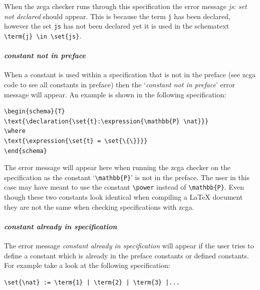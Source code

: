 When the \gls{zcga} checker runs through this specification the error message
\emph{js: set not declared} should appear. This is because the term \verb|j| has
been declared, however the set \verb|js| has not been declared yet it is used in
the schematext \verb|\term{j} \in \set{js}|.

\paragraph{\emph{constant not in preface}}

When a constant is used within a specification that is not in the preface (see
\gls{zcga} code to see all constants in preface) then the `\emph{constant not in
preface}' error message will appear. An example is shown in the following
specification:

\begin{exam}
\begin{verbatim}       
\begin{schema}{T}
\text{\declaration{\set{t}:\expression{\mathbb{P} \nat}}}
\where
\text{\expression{\set{t} = \set{\{\}}}}
\end{schema}
\end{verbatim}
\end{exam}

The error message will appear here when running the \gls{zcga} checker on the
specification as the constant `\verb|\mathbb{P}|' is not in the preface. The
user in this case may have meant to use the constant \verb|\power| instead of
\verb|\mathbb{P}|. Even though these two constants look identical when compiling
a \LaTeX{} document they are not the same when checking specifications with
\gls{zcga}.

\paragraph{\emph{constant already in specification}}

The error message \emph{constant already in specification} will appear if the
user tries to define a constant which is already in the preface constants or
defined constants. For example take a look at the following specification:

\begin{exam}
\begin{verbatim}
\set{\nat} := \term{1} | \term{2} | \term{3} |...
\end{verbatim}
\end{exam}

